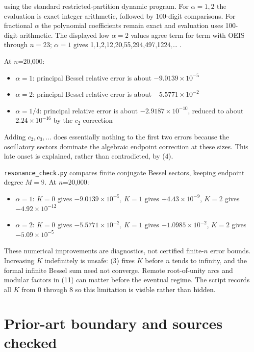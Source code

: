 \documentclass[11pt,letterpaper]{article}
\providecommand{\tightlist}{\setlength{\itemsep}{0pt}\setlength{\parskip}{0pt}}
\begin{document}
using the standard restricted-partition dynamic program. For
\(\alpha=1,2\) the evaluation is exact integer arithmetic, followed by
100-digit comparisons. For fractional \(\alpha\) the polynomial
coefficients remain exact and evaluation uses 100-digit arithmetic. The
displayed low \(\alpha=2\) values agree term for term with OEIS through
\(n=23\); \(\alpha=1\) gives 1,1,2,12,20,55,294,497,1224,\ldots{} .

At \(n\)=20,000:

\begin{itemize}
\tightlist
\item
  \(\alpha=1\): principal Bessel relative error is about \(-9.0139\times10^{-5}\)
\item
  \(\alpha=2\): principal Bessel relative error is about \(-5.5771\times10^{-2}\)
\item
  \(\alpha=1/4\): principal relative error is about \(-2.9187\times10^{-10}\), reduced
  to about \(2.24\times10^{-16}\) by the \(c_2\) correction
\end{itemize}

Adding \(c_2,c_3,\ldots\) does essentially nothing to the first two
errors because the oscillatory sectors dominate the algebraic endpoint
correction at these sizes. This late onset is explained, rather than
contradicted, by (4).

\texttt{resonance\_check.py} compares finite conjugate Bessel sectors,
keeping endpoint degree \(M=9\). At \(n\)=20,000:

\begin{itemize}
\tightlist
\item
  \(\alpha=1\): \(K=0\) gives \(-9.0139\times10^{-5}\), \(K=1\) gives \(+4.43\times10^{-9}\),
  \(K=2\) gives \(-4.92\times10^{-12}\)
\item
  \(\alpha=2\): \(K=0\) gives \(-5.5771\times10^{-2}\), \(K=1\) gives \(-1.0985\times10^{-2}\),
  \(K=2\) gives \(-5.09\times10^{-5}\)
\end{itemize}

These numerical improvements are diagnostics, not certified finite-\(n\)
error bounds. Increasing \(K\) indefinitely is unsafe: (3) fixes \(K\)
before \(n\) tends to infinity, and the formal infinite Bessel sum need
not converge. Remote root-of-unity arcs and modular factors in (11) can
matter before the eventual regime. The script records all \(K\) from 0
through 8 so this limitation is visible rather than hidden.

\section{Prior-art boundary and sources
checked}\label{mfp:prior-art-boundary-and-sources-checked}
\end{document}
